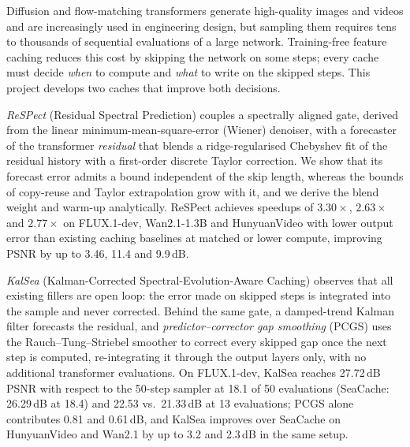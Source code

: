 Diffusion and flow-matching transformers generate high-quality images and videos and are increasingly used in engineering design, but sampling them requires tens to thousands of sequential evaluations of a large network. Training-free feature caching reduces this cost by skipping the network on some steps; every cache must decide \emph{when} to compute and \emph{what} to write on the skipped steps. This project develops two caches that improve both decisions.

\emph{ReSPect} (Residual Spectral Prediction) couples a spectrally aligned gate, derived from the linear minimum-mean-square-error (Wiener) denoiser, with a forecaster of the transformer \emph{residual} that blends a ridge-regularised Chebyshev fit of the residual history with a first-order discrete Taylor correction. We show that its forecast error admits a bound independent of the skip length, whereas the bounds of copy-reuse and Taylor extrapolation grow with it, and we derive the blend weight and warm-up analytically. ReSPect achieves speedups of $3.30\times$, $2.63\times$ and $2.77\times$ on FLUX.1-dev, Wan2.1-1.3B and HunyuanVideo with lower output error than existing caching baselines at matched or lower compute, improving PSNR by up to 3.46, 11.4 and 9.9\,dB.

\emph{KalSea} (Kalman-Corrected Spectral-Evolution-Aware Caching) observes that all existing fillers are open loop: the error made on skipped steps is integrated into the sample and never corrected. Behind the same gate, a damped-trend Kalman filter forecasts the residual, and \emph{predictor--corrector gap smoothing} (PCGS) uses the Rauch--Tung--Striebel smoother to correct every skipped gap once the next step is computed, re-integrating it through the output layers only, with no additional transformer evaluations. On FLUX.1-dev, KalSea reaches 27.72\,dB PSNR with respect to the 50-step sampler at 18.1 of 50 evaluations (SeaCache: 26.29\,dB at 18.4) and 22.53 vs.\ 21.33\,dB at 13 evaluations; PCGS alone contributes 0.81 and 0.61\,dB, and KalSea improves over SeaCache on HunyuanVideo and Wan2.1 by up to 3.2 and 2.3\,dB in the same setup.

